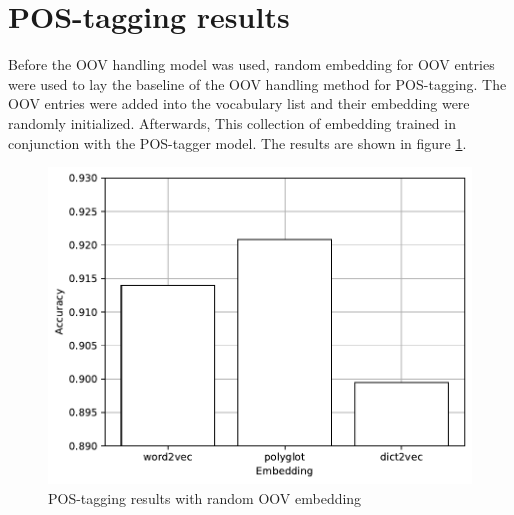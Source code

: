     \section{POS-tagging results}
      Before the OOV handling model was used, random embedding for OOV
      entries were used to lay the baseline of the OOV handling method
      for POS-tagging. The OOV entries were added into the vocabulary
      list and their embedding were randomly initialized. Afterwards,
      This collection of embedding trained in conjunction with the
      POS-tagger model. The results are shown in figure
      \ref{fig:postag_random_results}.
      \begin{figure}[H]
        \centering
        \includegraphics[width=0.8\linewidth]{images/random_graph.pdf}
        \caption{POS-tagging results with random OOV embedding}
        \label{fig:postag_random_results}
      \end{figure}

